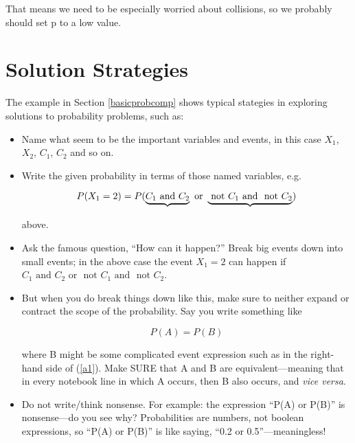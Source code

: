 That means we need to be especially worried about collisions, so we
probably should set p to a low value.

\section{Solution Strategies}

The example in Section \ref{basicprobcomp} shows typical stategies in
exploring solutions to probability problems, such as:

\begin{itemize}

\item Name what seem to be the important variables and events, in this case 
$X_1$, $X_2$, $C_1$, $C_2$ and so on.

\item Write the given probability in terms of those named variables,
e.g.  

\begin{equation}
P(X_1 = 2) 
= P(\underbrace{ C_1 {\rm ~and~} C_2 } {\rm ~or~ } 
\underbrace{ {\rm ~not~} C_1 {\rm ~and~} ~{\rm not}~ C_2 } ) 
\end{equation}

above.

\item Ask the famous question, ``How can it happen?''  
Break big events down into small events; in the above case
the event $X_1 = 2$ can happen if $C_1 
\textrm{ and } 
C_2 
\textrm{ or } 
\textrm{ not } 
C_1 
\textrm{ and } 
\textrm{ not } 
C_2$.

\item But when you do break things down like this, make sure to neither
expand or contract the scope of the probability.  Say you write
something like

\begin{equation}
P(A) = P(B)
\end{equation}

where B might be some complicated event expression such as in the
right-hand side of (\ref{a1}).  Make SURE that A and B are
equivalent---meaning that in every notebook line in which A occurs, then
B also occurs, and {\it vice versa}.

\item Do not write/think nonsense.  For example: the expression ``P(A)
or P(B)'' is nonsense---do you see why?  Probabilities are numbers, not
boolean expressions, so ``P(A) or P(B)'' is like saying, ``0.2 or
0.5''---meaningless!


\end{itemize}
